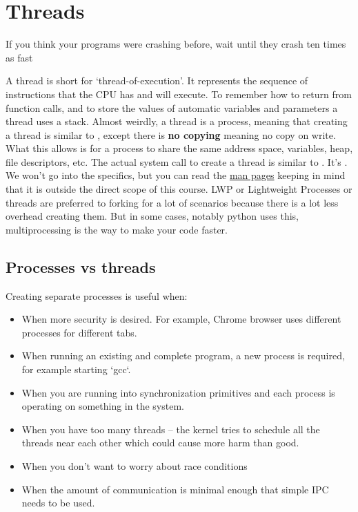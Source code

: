 \chapter{Threads}

\epigraph{If you think your programs were crashing before, wait until they crash ten times as fast}{}

A thread is short for `thread-of-execution'.
It represents the sequence of instructions that the CPU has and will execute.
To remember how to return from function calls, and to store the values of automatic variables and parameters a thread uses a stack.
Almost weirdly, a thread is a process, meaning that creating a thread is similar to , except there is \textbf{no copying} meaning no copy on write.
What this allows is for a process to share the same address space, variables, heap, file descriptors, etc.
The actual system call to create a thread is similar to . It's .
We won't go into the specifics, but you can read the \href{http://man7.org/linux/man-pages/man2/clone.2.html}{man pages} keeping in mind that it is outside the direct scope of this course.
LWP or Lightweight Processes or threads are preferred to forking for a lot of scenarios because there is a lot less overhead creating them.
But in some cases, notably python uses this, multiprocessing is the way to make your code faster.

\section{Processes vs threads}

Creating separate processes is useful when:

\begin{itemize}
\item When more security is desired. For example, Chrome browser uses different processes for different tabs.
\item When running an existing and complete program, a new process is required, for example starting `gcc`.
\item When you are running into synchronization primitives and each process is operating on something in the system.
\item When you have too many threads -- the kernel tries to schedule all the threads near each other which could cause more harm than good.
\item When you don't want to worry about race conditions
\item When the amount of communication is minimal enough that simple IPC needs to be used.
\end{itemize}

